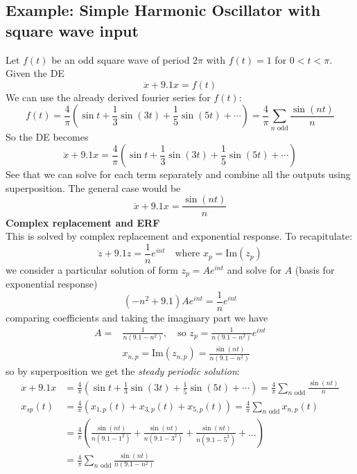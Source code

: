 \documentclass{report}
\begin{document}
\subsection{Example: Simple Harmonic Oscillator with square wave input}
Let $f(t)$ be an odd square wave of period $2\pi$ with $f(t)=1$ for $0<t<\pi$. Given the DE
\begin{equation*}
\ddot{x}+9.1x=f(t)
\end{equation*}
We can use the already derived fourier series for $f(t)$:
\begin{equation*}
f(t)=\frac{4}{\pi}\left(
\sin t+\frac{1}{3}\sin(3t)+\frac{1}{5}\sin(5t)+\cdots\right)=\frac{4}{\pi}\sum_{n\text{ odd}}\frac{\sin(nt)}{n}
\end{equation*}
So the DE becomes
\begin{equation*}
\ddot{x}+9.1x=\frac{4}{\pi}\left(
\sin t+\frac{1}{3}\sin(3t)+\frac{1}{5}\sin(5t)+\cdots\right)
\end{equation*}
See that we can solve for each term separately and combine all the outputs using superposition. The general case
would be
\begin{equation*}
\ddot{x}+9.1x=\frac{\sin(nt)}{n}
\end{equation*}
\textbf{Complex replacement and ERF}\\
This is solved by complex replacement and exponential response. To recapitulate:
\begin{equation*}
\ddot{z}+9.1z=\frac{1}{n}e^{int}\quad\text{where }x_p=\text{Im}(z_p)
\end{equation*}
we consider a particular solution of form $z_p=Ae^{int}$ and solve for $A$ (basis for exponential response)
\begin{equation*}
(-n^2+9.1)Ae^{int}=\frac{1}{n}e^{int}
\end{equation*}
comparing coefficients and taking the imaginary part we have
\begin{align*}
A=&\frac{1}{n(9.1-n^2)},\quad\text{so }z_p=\frac{1}{n(9.1-n^2)}e^{int}\\
&x_{n,p}=\text{Im}(z_{n,p})=\frac{\sin(nt)}{n(9.1-n^2)}
\end{align*}
so by superposition we get the \textit{steady periodic solution}:
\begin{align*}
\ddot{x}+9.1x&=\frac{4}{\pi}\left(
\sin t+\frac{1}{3}\sin(3t)+\frac{1}{5}\sin(5t)+\cdots\right)=\frac{4}{\pi}\sum_{n\text{ odd}}\frac{\sin(nt)}{n}\\
x_{sp}(t)&=\frac{4}{\pi}(x_{1,p}(t)+x_{3,p}(t)+x_{5,p}(t))=
\frac{4}{\pi}\sum_{n\text{ odd}}x_{n,p}(t)\\
&=\frac{4}{\pi}\left(\frac{\sin(nt)}{n(9.1-1^2)}+\frac{\sin(nt)}{n(9.1-3^2)}+\frac{\sin(nt)}{n(9.1-5^2)}+
\ldots\right)\\&=\frac{4}{\pi}\sum_{n\text{ odd}}\frac{\sin(nt)}{n(9.1-n^2)}
\end{align*}
\end{document}
